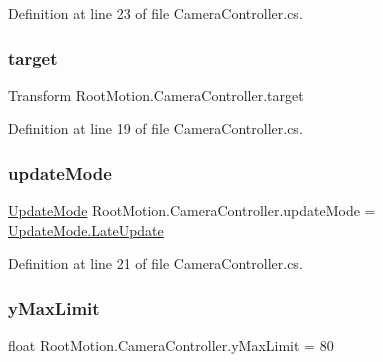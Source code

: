 Definition at line 23 of file Camera\+Controller.\+cs.

\mbox{\label{class_root_motion_1_1_camera_controller_a0589d3fa45a82b6a79522a16dfba11f4}} 
\subsubsection{\texorpdfstring{target}{target}}
{\footnotesize\ttfamily Transform Root\+Motion.\+Camera\+Controller.\+target}



Definition at line 19 of file Camera\+Controller.\+cs.

\mbox{\label{class_root_motion_1_1_camera_controller_abd10bb8a6fd472893836243533966417}} 
\subsubsection{\texorpdfstring{update\+Mode}{updateMode}}
{\footnotesize\ttfamily \mbox{\hyperlink{class_root_motion_1_1_camera_controller_ae662cdbe3ccf669cdb38fad428386edb}{Update\+Mode}} Root\+Motion.\+Camera\+Controller.\+update\+Mode = \mbox{\hyperlink{class_root_motion_1_1_camera_controller_ae662cdbe3ccf669cdb38fad428386edba2609005edfde618c70f2140bb3e9b7c2}{Update\+Mode.\+Late\+Update}}}



Definition at line 21 of file Camera\+Controller.\+cs.

\mbox{\label{class_root_motion_1_1_camera_controller_afe4d04c437d077e5b5cc438da117c409}} 
\subsubsection{\texorpdfstring{y\+Max\+Limit}{yMaxLimit}}
{\footnotesize\ttfamily float Root\+Motion.\+Camera\+Controller.\+y\+Max\+Limit = 80}




